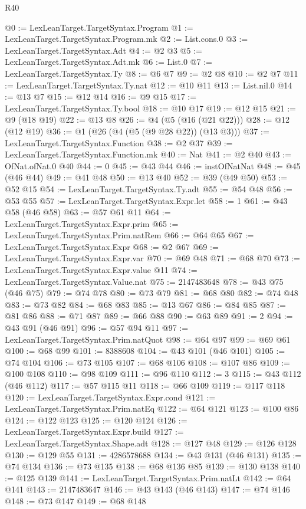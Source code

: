 \begin{lexlean}{R40}
\begin{coremodule}
@0 := LexLeanTarget.TargetSyntax.Program
@1 := LexLeanTarget.TargetSyntax.Program.mk
@2 := List.cons.{0}
@3 := LexLeanTarget.TargetSyntax.Adt
@4 := @2 @3
@5 := LexLeanTarget.TargetSyntax.Adt.mk
@6 := List.{0}
@7 := LexLeanTarget.TargetSyntax.Ty
@8 := @6 @7
@9 := @2 @8
@10 := @2 @7
@11 := LexLeanTarget.TargetSyntax.Ty.nat
@12 := @10 @11
@13 := List.nil.{0}
@14 := @13 @7
@15 := @12 @14
@16 := @9 @15
@17 := LexLeanTarget.TargetSyntax.Ty.bool
@18 := @10 @17
@19 := @12 @15
@21 := @9 (@18 @19)
@22 := @13 @8
@26 := @4 (@5 (@16 (@21 @22)))
@28 := @12 (@12 @19)
@36 := @1 (@26 (@4 (@5 (@9 @28 @22)) (@13 @3)))
@37 := LexLeanTarget.TargetSyntax.Function
@38 := @2 @37
@39 := LexLeanTarget.TargetSyntax.Function.mk
@40 := Nat
@41 := @2 @40
@43 := OfNat.ofNat.{0} @40
@44 := 0
@45 := @43 @44
@46 := instOfNatNat
@48 := @45 (@46 @44)
@49 := @41 @48
@50 := @13 @40
@52 := @39 (@49 @50)
@53 := @52 @15
@54 := LexLeanTarget.TargetSyntax.Ty.adt
@55 := @54 @48
@56 := @53 @55
@57 := LexLeanTarget.TargetSyntax.Expr.let
@58 := 1
@61 := @43 @58 (@46 @58)
@63 := @57 @61 @11
@64 := LexLeanTarget.TargetSyntax.Expr.prim
@65 := LexLeanTarget.TargetSyntax.Prim.natRem
@66 := @64 @65
@67 := LexLeanTarget.TargetSyntax.Expr
@68 := @2 @67
@69 := LexLeanTarget.TargetSyntax.Expr.var
@70 := @69 @48
@71 := @68 @70
@73 := LexLeanTarget.TargetSyntax.Expr.value @11
@74 := LexLeanTarget.TargetSyntax.Value.nat
@75 := 2147483648
@78 := @43 @75 (@46 @75)
@79 := @74 @78
@80 := @73 @79
@81 := @68 @80
@82 := @74 @48
@83 := @73 @82
@84 := @68 @83
@85 := @13 @67
@86 := @84 @85
@87 := @81 @86
@88 := @71 @87
@89 := @66 @88
@90 := @63 @89
@91 := 2
@94 := @43 @91 (@46 @91)
@96 := @57 @94 @11
@97 := LexLeanTarget.TargetSyntax.Prim.natQuot
@98 := @64 @97
@99 := @69 @61
@100 := @68 @99
@101 := 8388608
@104 := @43 @101 (@46 @101)
@105 := @74 @104
@106 := @73 @105
@107 := @68 @106
@108 := @107 @86
@109 := @100 @108
@110 := @98 @109
@111 := @96 @110
@112 := 3
@115 := @43 @112 (@46 @112)
@117 := @57 @115 @11
@118 := @66 @109
@119 := @117 @118
@120 := LexLeanTarget.TargetSyntax.Expr.cond
@121 := LexLeanTarget.TargetSyntax.Prim.natEq
@122 := @64 @121
@123 := @100 @86
@124 := @122 @123
@125 := @120 @124
@126 := LexLeanTarget.TargetSyntax.Expr.build
@127 := LexLeanTarget.TargetSyntax.Shape.adt
@128 := @127 @48
@129 := @126 @128
@130 := @129 @55
@131 := 4286578688
@134 := @43 @131 (@46 @131)
@135 := @74 @134
@136 := @73 @135
@138 := @68 @136 @85
@139 := @130 @138
@140 := @125 @139
@141 := LexLeanTarget.TargetSyntax.Prim.natLt
@142 := @64 @141
@143 := 2147483647
@146 := @43 @143 (@46 @143)
@147 := @74 @146
@148 := @73 @147
@149 := @68 @148

\end{coremodule}
\end{lexlean}
